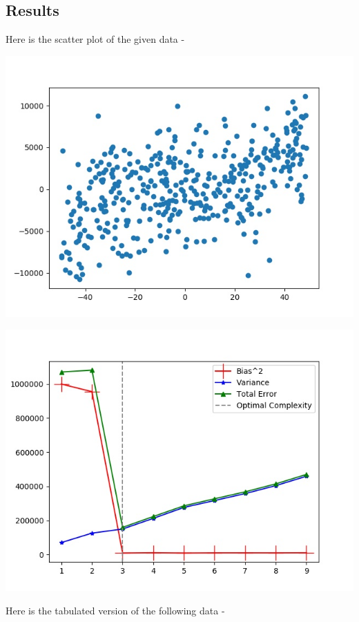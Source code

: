 \documentclass[11pt]{article}
\begin{document}
	\subsection{Results}
	Here is the scatter plot of the given data - 
	\begin{center}
			\hspace{-1.5cm}\includegraphics[scale=0.8]{../q2scatter.jpg}
	\end{center}
	\begin{center}
		\includegraphics{../q2.jpg}
	\end{center}
	Here is the tabulated version of the following data - 
\end{document}
